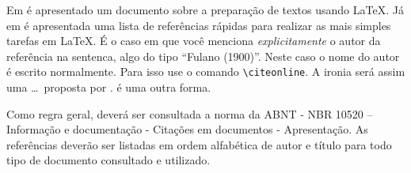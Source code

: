 \documentclass[12pt]{article}
\begin{document}
Em \cite{lamport94} é apresentado um documento sobre a preparação de textos usando \LaTeX. Já em  \cite{goossens94} é apresentada uma lista de referências rápidas para realizar as mais simples tarefas em \LaTeX. É o caso em que você menciona \emph{explicitamente} o autor da referência na sentenca, algo  do tipo ``Fulano (1900)''. Neste caso o nome do autor é escrito normalmente. Para isso use o comando \verb+\citeonline+. A ironia será assim uma \ldots\ proposta  por .  é uma outra forma.

Como regra geral, deverá ser consultada a norma da ABNT - NBR 10520 – Informação e documentação - Citações em documentos - Apresentação. As referências deverão ser listadas em ordem alfabética de autor e título para todo tipo de documento consultado e utilizado.





\end{document}
